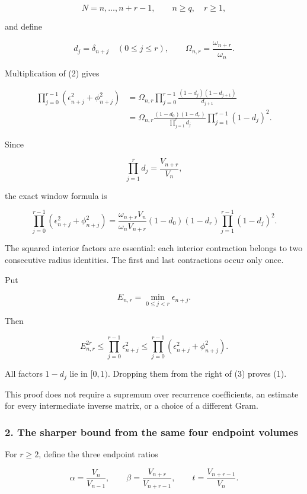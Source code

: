 \[
N=n,\ldots,n+r-1,\qquad n\ge q,\quad r\ge1,
\]

and define

\[
d_j=\delta_{n+j}\quad(0\le j\le r),
\qquad
\Omega_{n,r}=\frac{\omega_{n+r}}{\omega_n}.
\]

Multiplication of (2) gives

\[
\begin{aligned}
\prod_{j=0}^{r-1}
(\epsilon_{n+j}^2+\phi_{n+j}^2)
&=
\Omega_{n,r}
\prod_{j=0}^{r-1}
\frac{(1-d_j)(1-d_{j+1})}{d_{j+1}}\\
&=
\Omega_{n,r}
\frac{(1-d_0)(1-d_r)}
{\prod_{j=1}^{r}d_j}
\prod_{j=1}^{r-1}(1-d_j)^2.
\end{aligned}
\]

Since

\[
\prod_{j=1}^{r}d_j=\frac{V_{n+r}}{V_n},
\]

the exact window formula is

\[
\boxed{
\prod_{j=0}^{r-1}
(\epsilon_{n+j}^2+\phi_{n+j}^2)
=
\frac{\omega_{n+r}V_n}{\omega_nV_{n+r}}
(1-d_0)(1-d_r)
\prod_{j=1}^{r-1}(1-d_j)^2.
}
\tag{3}
\]

The squared interior factors are essential: each interior contraction belongs to two consecutive radius identities. The first and last contractions occur only once.

Put

\[
E_{n,r}=\min_{0\le j<r}\epsilon_{n+j}.
\]

Then

\[
E_{n,r}^{2r}
\le
\prod_{j=0}^{r-1}\epsilon_{n+j}^2
\le
\prod_{j=0}^{r-1}(\epsilon_{n+j}^2+\phi_{n+j}^2).
\]

All factors \(1-d_j\) lie in \([0,1)\). Dropping them from the right of (3) proves (1).

This proof does not require a supremum over recurrence coefficients, an estimate for every intermediate inverse matrix, or a choice of a different Gram.

\subsubsection{2. The sharper bound from the same four endpoint volumes}\label{endpoint-user_product_original--the-sharper-bound-from-the-same-four-endpoint-volumes}

For \(r\ge2\), define the three endpoint ratios

\[
\alpha=\frac{V_n}{V_{n-1}},\qquad
\beta=\frac{V_{n+r}}{V_{n+r-1}},\qquad
t=\frac{V_{n+r-1}}{V_n}.
\]

